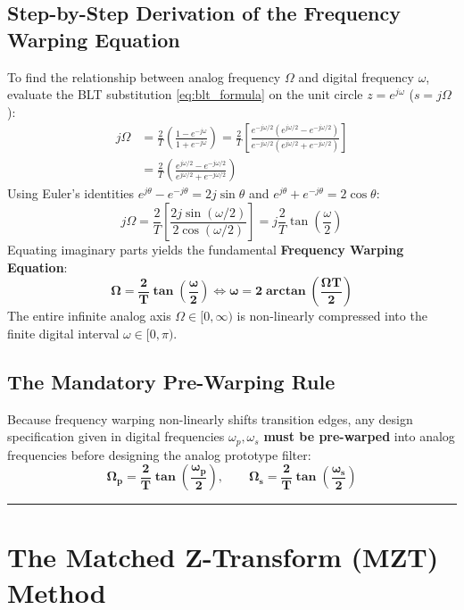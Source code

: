 \documentclass[11pt,a4paper]{article}
\begin{document}
\subsection{Step-by-Step Derivation of the Frequency Warping Equation}
To find the relationship between analog frequency $\Omega$ and digital frequency $\omega$, evaluate the BLT substitution \eqref{eq:blt_formula} on the unit circle $z = e^{j\omega}$ ($s = j\Omega$):
\begin{align}
j\Omega &= \frac{2}{T} \left( \frac{1 - e^{-j\omega}}{1 + e^{-j\omega}} \right) = \frac{2}{T} \left[ \frac{e^{-j\omega/2} (e^{j\omega/2} - e^{-j\omega/2})}{e^{-j\omega/2} (e^{j\omega/2} + e^{-j\omega/2})} \right] \nonumber \\
&= \frac{2}{T} \left( \frac{e^{j\omega/2} - e^{-j\omega/2}}{e^{j\omega/2} + e^{-j\omega/2}} \right)
\end{align}
Using Euler's identities $e^{j\theta} - e^{-j\theta} = 2j\sin\theta$ and $e^{j\theta} + e^{-j\theta} = 2\cos\theta$:
\begin{equation}
j\Omega = \frac{2}{T} \left[ \frac{2j\sin(\omega/2)}{2\cos(\omega/2)} \right] = j \frac{2}{T} \tan\left(\frac{\omega}{2}\right)
\end{equation}
Equating imaginary parts yields the fundamental \textbf{Frequency Warping Equation}:
\begin{equation}
\mathbf{\Omega = \frac{2}{T} \tan\left(\frac{\omega}{2}\right)} \iff \mathbf{\omega = 2 \arctan\left(\frac{\Omega T}{2}\right)}
\end{equation}
The entire infinite analog axis $\Omega \in [0, \infty)$ is non-linearly compressed into the finite digital interval $\omega \in [0, \pi)$.

\subsection{The Mandatory Pre-Warping Rule}
Because frequency warping non-linearly shifts transition edges, any design specification given in digital frequencies $\omega_p, \omega_s$ \textbf{must be pre-warped} into analog frequencies before designing the analog prototype filter:
\begin{equation}
\mathbf{\Omega_p = \frac{2}{T} \tan\left(\frac{\omega_p}{2}\right)}, \qquad \mathbf{\Omega_s = \frac{2}{T} \tan\left(\frac{\omega_s}{2}\right)}
\end{equation}

\noindent\rule{\textwidth}{0.5pt}

\section{The Matched Z-Transform (MZT) Method}
\end{document}
